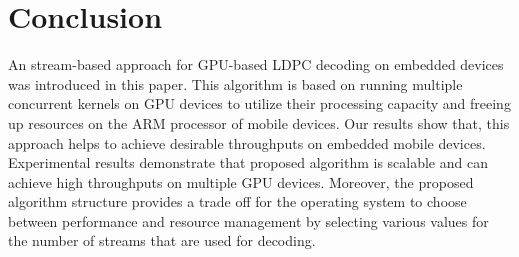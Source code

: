 \documentclass{article}
\begin{document}
\section{Conclusion}
An stream-based approach for GPU-based LDPC decoding on embedded devices was introduced in this paper. This algorithm is based on running multiple concurrent kernels on GPU devices to utilize their processing capacity and freeing up resources on the ARM processor of mobile devices. Our results show that, this approach helps to achieve desirable throughputs on embedded mobile devices. Experimental results demonstrate that proposed algorithm is scalable and can achieve high throughputs on multiple GPU devices. Moreover, the proposed algorithm structure provides a trade off for the operating system to choose between performance and resource management by selecting various values for the number of streams that are used for decoding.

\newpage



\end{document}
